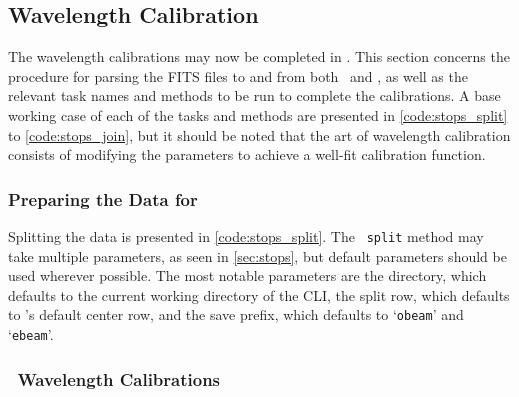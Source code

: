 \pagebreak

\subsection{Wavelength Calibration} \label{subsec:reduc_wav}

The wavelength calibrations may now be completed in \iraf. This section concerns the procedure for parsing the \gls{FITS} files to and from both \iraf\ and \polsalt, as well as the relevant task names and methods to be run to complete the calibrations. A base working case of each of the tasks and methods are presented in \autoref{code:stops_split} to \ref{code:stops_join}, but it should be noted that the art of wavelength calibration consists of modifying the parameters to achieve a well-fit calibration function.%

\subsubsection{Preparing the Data for \iraf}

Splitting the data is presented in \autoref{code:stops_split}. The \stops\ \texttt{split} method may take multiple parameters, as seen in \autoref{sec:stops}, but default parameters should be used wherever possible. The most notable parameters are the directory, which defaults to the current working directory of the \gls{CLI}, the split row, which defaults to \polsalt's default center row, and the save prefix, which defaults to `\texttt{obeam}' and `\texttt{ebeam}'.

\subsubsection{\iraf\ Wavelength Calibrations}

